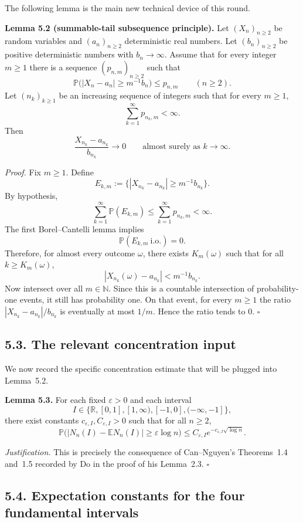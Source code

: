 The following lemma is the main new technical device of this round.

\medskip
\noindent\textbf{Lemma 5.2 (summable-tail subsequence principle).}
Let $(X_n)_{n\ge2}$ be random variables and $(a_n)_{n\ge2}$ deterministic real numbers. Let $(b_n)_{n\ge2}$ be positive deterministic numbers with $b_n\to\infty$. Assume that for every integer $m\ge1$ there is a sequence $(p_{n,m})_{n\ge2}$ such that
\[
\mathbb P\bigl(|X_n-a_n|\ge m^{-1}b_n\bigr)\le p_{n,m}
\qquad(n\ge2).
\]
Let $(n_k)_{k\ge1}$ be an increasing sequence of integers such that for every $m\ge1$,
\[
\sum_{k=1}^\infty p_{n_k,m}<\infty.
\]
Then
\[
\frac{X_{n_k}-a_{n_k}}{b_{n_k}}\to0
\qquad\text{almost surely as }k\to\infty.
\]

\medskip
\noindent\emph{Proof.}
Fix $m\ge1$. Define
\[
E_{k,m}:=\bigl\{|X_{n_k}-a_{n_k}|\ge m^{-1}b_{n_k}\bigr\}.
\]
By hypothesis,
\[
\sum_{k=1}^\infty \mathbb P(E_{k,m})\le \sum_{k=1}^\infty p_{n_k,m}<\infty.
\]
The first Borel--Cantelli lemma implies
\[
\mathbb P(E_{k,m}\ \text{i.o.})=0.
\]
Therefore, for almost every outcome $\omega$, there exists $K_m(\omega)$ such that for all $k\ge K_m(\omega)$,
\[
|X_{n_k}(\omega)-a_{n_k}|<m^{-1}b_{n_k}.
\]
Now intersect over all $m\in\mathbb N$. Since this is a countable intersection of probability-one events, it still has probability one. On that event, for every $m\ge1$ the ratio $|X_{n_k}-a_{n_k}|/b_{n_k}$ is eventually at most $1/m$. Hence the ratio tends to $0$.
\hfill$\square$

\subsection*{5.3. The relevant concentration input}

We now record the specific concentration estimate that will be plugged into Lemma~5.2.

\medskip
\noindent\textbf{Lemma 5.3.}
For each fixed $\varepsilon>0$ and each interval
\[
I\in\{\mathbb R,[0,1],[1,\infty),[-1,0],(-\infty,-1]\},
\]
there exist constants $c_{\varepsilon,I},C_{\varepsilon,I}>0$ such that for all $n\ge2$,
\[
\mathbb P\bigl(|N_n(I)-\mathbb E N_n(I)|\ge \varepsilon\log n\bigr)
\le C_{\varepsilon,I}e^{-c_{\varepsilon,I}\sqrt{\log n}}.
\]

\medskip
\noindent\emph{Justification.}
This is precisely the consequence of Can--Nguyen's Theorems~1.4 and~1.5 recorded by Do in the proof of his Lemma~2.3.
\hfill$\square$

\subsection*{5.4. Expectation constants for the four fundamental intervals}


